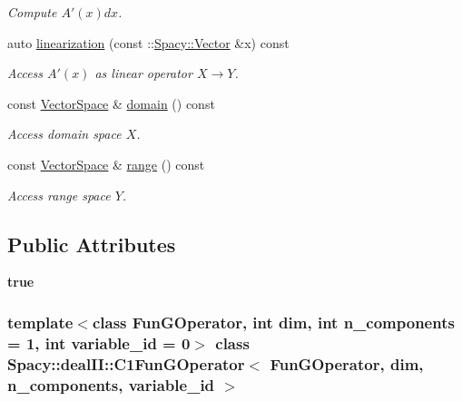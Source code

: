 \begin{DoxyCompactItemize}
\begin{DoxyCompactList}\small\item\em \-Compute $A'(x)dx$. \end{DoxyCompactList}\item 
auto \hyperlink{classSpacy_1_1dealII_1_1C1FunGOperator_a8fabdc6f71797487de9df1ed579a74bc}{linearization} (const \-::\hyperlink{classSpacy_1_1Vector}{\-Spacy\-::\-Vector} \&x) const 
\begin{DoxyCompactList}\small\item\em \-Access $A'(x)$ as linear operator $X\rightarrow Y$. \end{DoxyCompactList}\item 
\hypertarget{classSpacy_1_1OperatorBase_a2588f9b3e0188820c4c494e63293dc6f}{const \hyperlink{classSpacy_1_1VectorSpace}{\-Vector\-Space} \& \hyperlink{classSpacy_1_1OperatorBase_a2588f9b3e0188820c4c494e63293dc6f}{domain} () const }\label{classSpacy_1_1OperatorBase_a2588f9b3e0188820c4c494e63293dc6f}

\begin{DoxyCompactList}\small\item\em \-Access domain space $X$. \end{DoxyCompactList}\item 
\hypertarget{classSpacy_1_1OperatorBase_ab19d3b7a6f290b1079248f1e567e53d6}{const \hyperlink{classSpacy_1_1VectorSpace}{\-Vector\-Space} \& \hyperlink{classSpacy_1_1OperatorBase_ab19d3b7a6f290b1079248f1e567e53d6}{range} () const }\label{classSpacy_1_1OperatorBase_ab19d3b7a6f290b1079248f1e567e53d6}

\begin{DoxyCompactList}\small\item\em \-Access range space $Y$. \end{DoxyCompactList}\end{DoxyCompactItemize}
\subsection*{\-Public \-Attributes}
\begin{DoxyCompactItemize}
\item 
\hypertarget{classSpacy_1_1dealII_1_1C1FunGOperator_ae67fa2bc54976dd353934e8241e30a0a}{{\bfseries true}}\label{classSpacy_1_1dealII_1_1C1FunGOperator_ae67fa2bc54976dd353934e8241e30a0a}

\end{DoxyCompactItemize}
\subsubsection*{template$<$class Fun\-G\-Operator, int dim, int n\-\_\-components = 1, int variable\-\_\-id = 0$>$ class Spacy\-::deal\-I\-I\-::\-C1\-Fun\-G\-Operator$<$ Fun\-G\-Operator, dim, n\-\_\-components, variable\-\_\-id $>$}



